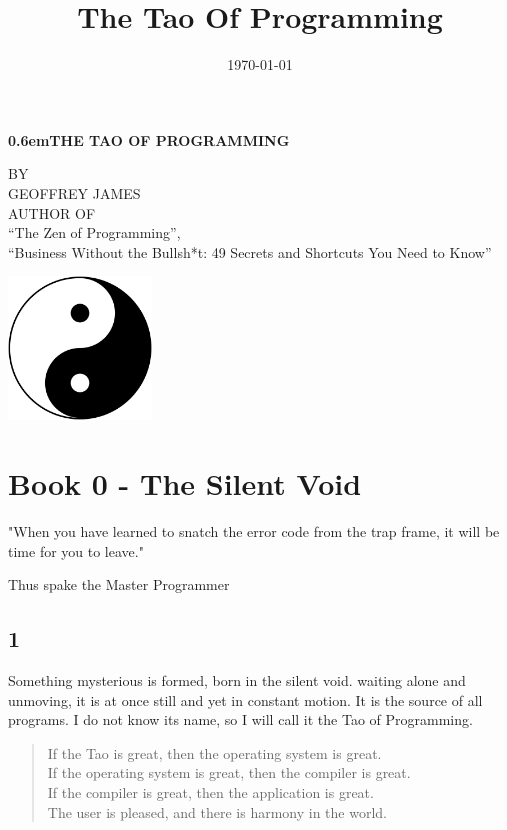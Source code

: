 \documentclass[14pt, letterpaper]{book}
\title{The Tao Of Programming}
\date{\today}
\begin{document}
\ECFJD

\clearpage

\newcommand\nbvspace[1][3]{\vspace*{\stretch{#1}}}
\newcommand\nbstretchyspace{\spaceskip0.5em plus 0.25em minus 0.25em}
\newcommand{\nbtitlestretch}{\spaceskip0.6em}

\pagestyle{empty}
\begin{center}
\bfseries
\nbvspace[1]
\Huge
{\nbtitlestretch\huge THE TAO OF PROGRAMMING}

\nbvspace[1]
\normalsize
\nbvspace[1]
\small BY\\
\Large GEOFFREY JAMES\\[0.5em]
\footnotesize AUTHOR OF \\ ``The Zen of Programming'', \\``Business Without the Bullsh*t: 49 Secrets and Shortcuts You Need to Know''

\nbvspace[2]

\includegraphics[width=1.5in]{Yin_yang.png}
\nbvspace[3]
\normalsize

\end{center}



\chapter*{Book 0 - The Silent Void}
\epigraph{"When you have learned to snatch the error code from the trap frame, it will be time for you to leave."}{Thus spake the Master Programmer}

\section*{1}

Something mysterious is formed, born in the silent void. waiting alone and unmoving, it is at once still and yet in constant motion. It is the source of all programs. I do not know its name, so I will call it the Tao of Programming.


\begin{verse}
If the Tao is great, then the operating system is great. \\
If the operating system is great, then the compiler is great. \\
If the compiler is great, then the application is great. \\
The user is pleased, and there is harmony in the world.\\
\end{verse}
\end{document}
